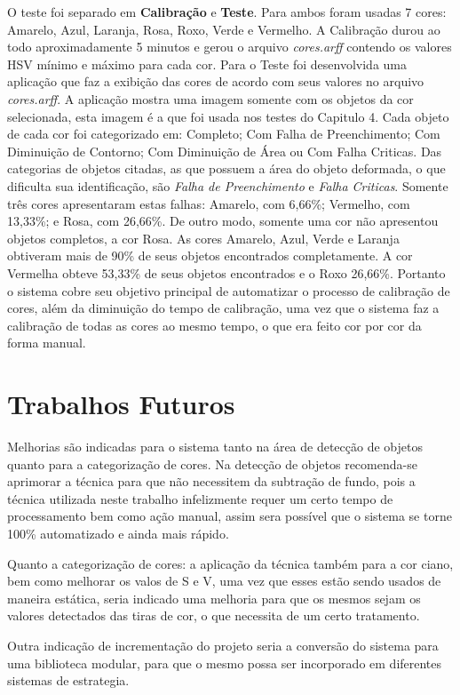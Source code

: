 O teste foi separado em \textbf{Calibração} e \textbf{Teste}. Para ambos foram usadas 7 cores: Amarelo, Azul, Laranja, Rosa, Roxo, Verde e Vermelho. A Calibração durou ao todo aproximadamente 5 minutos e gerou o arquivo \textit{cores.arff} contendo os valores HSV mínimo e máximo para cada cor. Para o Teste foi desenvolvida uma aplicação que faz a exibição das cores de acordo com seus valores no arquivo \textit{cores.arff}. A aplicação mostra uma imagem somente com os objetos da cor selecionada, esta imagem é a que foi usada nos testes do Capitulo 4. Cada objeto de cada cor foi categorizado em: Completo; Com Falha de Preenchimento; Com Diminuição de Contorno; Com Diminuição de Área ou Com Falha Criticas. Das categorias de objetos citadas, as que possuem a área do objeto deformada, o que dificulta sua identificação, são \textit{Falha de Preenchimento} e \textit{Falha Criticas}. Somente tr\^{e}s cores apresentaram estas falhas: Amarelo, com 6,66\%; Vermelho, com 13,33\%; e Rosa, com 26,66\%. De outro modo, somente uma cor não apresentou objetos completos, a cor Rosa. As cores Amarelo, Azul, Verde e Laranja obtiveram mais de 90\% de seus objetos encontrados completamente. A cor Vermelha obteve 53,33\% de seus objetos encontrados e o Roxo 26,66\%. 
Portanto o sistema cobre seu objetivo principal de automatizar o processo de calibração de cores, além da diminuição do tempo de calibração, uma vez que o sistema faz a calibração de todas as cores ao mesmo tempo, o que era feito cor por cor da forma manual.	

\section{Trabalhos Futuros}
Melhorias são indicadas para o sistema tanto na área de detecção de objetos quanto para a categorização de cores. Na detecção de objetos recomenda-se aprimorar a técnica para que não necessitem da subtração de fundo, pois a técnica utilizada neste trabalho infelizmente requer um certo tempo de processamento bem como ação manual, assim sera possível que o sistema se torne 100\% automatizado e ainda mais rápido.

 Quanto a categorização de cores: a aplicação da técnica também para a cor ciano, bem como melhorar os valos de S e V, uma vez que esses estão sendo usados de maneira estática, seria indicado uma melhoria para que os mesmos sejam os valores detectados das tiras de cor, o que necessita de um certo tratamento.
 
Outra indicação de incrementação do projeto seria a conversão do sistema para uma biblioteca modular, para que o mesmo possa ser incorporado em diferentes sistemas de estrategia. 